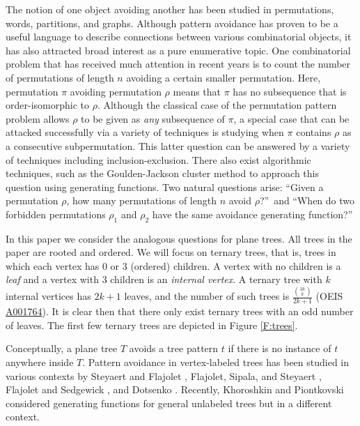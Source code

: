 \documentclass[12pt]{article}
\newcommand{\seqnum}[1]{\href{http://oeis.org/#1}{\underline{#1}}}
\begin{document}
The notion of one object avoiding another has been studied in permutations, words, partitions, and graphs.  Although pattern avoidance has proven to be a useful language to describe connections between various combinatorial objects, it has also attracted broad interest as a pure enumerative topic.  One combinatorial problem that has received much attention in recent years is to count the number of permutations of length $n$ avoiding a certain smaller permutation.  Here, permutation $\pi$ avoiding permutation $\rho$ means that $\pi$ has no subsequence that is order-isomorphic to $\rho$.  Although the classical case of the permutation pattern problem allows $\rho$ to be given as \emph{any} subsequence of $\pi$, a special case that can be attacked successfully via a variety of techniques is studying when $\pi$ contains $\rho$ as a consecutive subpermutation.  This latter question can be answered by a variety of techniques including inclusion-exclusion.  There also exist algorithmic techniques, such as the Goulden-Jackson cluster method \cite{GJ79, NZ99} to approach this question using generating functions.  Two natural questions arise: ``Given a permutation $\rho$, how many permutations of length $n$ avoid $\rho$?''\ and ``When do two forbidden permutations $\rho_1$ and $\rho_2$ have the same avoidance generating function?''

In this paper we consider the analogous questions for plane trees. All trees in the paper are rooted and ordered.  We will focus on ternary trees, that is, trees in which each vertex has 0 or 3 (ordered) children.  A vertex with no children is a \emph{leaf} and a vertex with 3 children is an \emph{internal vertex}.  A ternary tree with $k$ internal vertices has $2k+1$ leaves, and the number of such trees is $\frac{\binom{3k}{k}}{2k+1}$ (OEIS \seqnum{A001764}).  It is clear then that there only exist ternary trees with an odd number of leaves.  The first few ternary trees are depicted in Figure \ref{F:trees}.

Conceptually, a plane tree $T$ avoids a tree pattern $t$ if there is no instance of $t$ anywhere inside $T$. Pattern avoidance in vertex-labeled trees has been studied in various contexts by Steyaert and Flajolet \cite{SF83}, Flajolet, Sipala, and Steyaert \cite{FSS90}, Flajolet and Sedgewick \cite{FS09}, and Dotsenko \cite{DTBA}.  Recently, Khoroshkin and Piontkovski \cite{KPTBA} considered generating functions for general unlabeled trees but in a different context.
\end{document}
